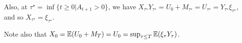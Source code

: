 Also, at $\tau^{\star} = \inf \{ t \geq 0 | A_{t+1} > 0 \}$, we have
$X_{\tau^{\star}} Y_{\tau^{\star}} = U_{0} + M_{\tau^{\star}} =
U_{\tau^{\star}} = Y_{\tau^{\star}} \xi_{\tau^{\star}}$, and so
$X_{\tau^{\star}} = \xi_{\tau^{\star}}$.

Note also that $X_{0} = \E{U_{0} + M_{T}} = U_{0} = \sup_{\tau \leq T}
\E{\xi_{\tau} Y_{\tau}}$.
 
\begin{remark}
  
\end{remark}

